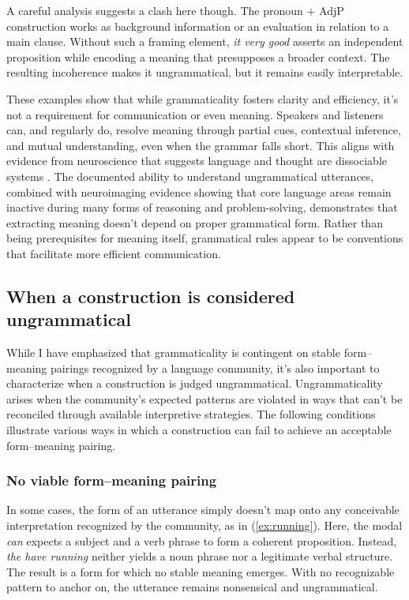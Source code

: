 \documentclass[12pt,letterpaper]{article}
\begin{document}
A careful analysis suggests a clash here though. The pronoun + AdjP construction works as background information or an evaluation in relation to a main clause. Without such a framing element, \textit{it very good} asserts an independent proposition while encoding a meaning that presupposes a broader context. The resulting incoherence makes it ungrammatical, but it remains easily interpretable.

These examples show that while grammaticality fosters clarity and efficiency, it's not a requirement for communication or even meaning. Speakers and listeners can, and regularly do, resolve meaning through partial cues, contextual inference, and mutual understanding, even when the grammar falls short. This aligns with evidence from neuroscience that suggests language and thought are dissociable systems \autocite{Fedorenko2024}. The documented ability to understand ungrammatical utterances, combined with neuroimaging evidence showing that core language areas remain inactive during many forms of reasoning and problem-solving, demonstrates that extracting meaning doesn't depend on proper grammatical form. Rather than being prerequisites for meaning itself, grammatical rules appear to be conventions that facilitate more efficient communication.


\subsection{When a construction is considered ungrammatical}\label{sec:ungrammatical}

While I have emphasized that grammaticality is contingent on stable form--meaning pairings recognized by a language community, it's also important to characterize when a construction is judged ungrammatical. Ungrammaticality arises when the community’s expected patterns are violated in ways that can't be reconciled through available interpretive strategies. The following conditions illustrate various ways in which a construction can fail to achieve an acceptable form--meaning pairing.

\subsubsection{No viable form--meaning pairing}

In some cases, the form of an utterance simply doesn't map onto any conceivable interpretation recognized by the community, as in (\ref{ex:running}).
\label{ex:running}
\z
Here, the modal \textit{can} expects a subject and a verb phrase to form a coherent proposition. Instead, \textit{the have running} neither yields a noun phrase nor a legitimate verbal structure. The result is a form for which no stable meaning emerges. With no recognizable pattern to anchor on, the utterance remains nonsensical and ungrammatical.
\end{document}

